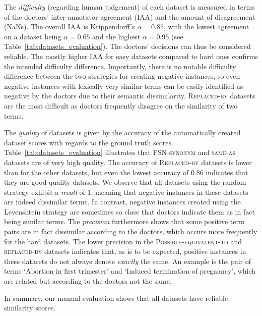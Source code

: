 \documentclass[letterpaper]{article} %
\newcommand{\lab}[1]{`#1'}
\newcommand{\dataset}[1]{\textsc{#1}}
\begin{document}
The \emph{difficulty} (regarding human judgement) of each dataset is measured in terms of the doctors' inter-annotator agreement (IAA) and the amount of disagreement (NaNs).
The overall IAA is Krippendorff's $\alpha = 0.85$,
with the lowest agreement on a dataset being $\alpha = 0.65$ and the highest $\alpha = 0.95$ (see Table~\ref{tab:datasets_evaluation}). The doctors' decisions can thus be considered reliable.
The mostly higher IAA for easy datasets compared to hard ones confirms the intended difficulty difference.
Importantly, there is no notable difficulty difference between the two strategies for creating negative instances, so even negative instances with lexically very similar terms can be easily identified as negative by the doctors due to their semantic dissimilarity.
\dataset{Replaced-by} datasets are the most difficult as doctors frequently disagree on the similarity of two terms. 

The \emph{quality} of datasets is given by the accuracy of the automatically created dataset scores with regards to the ground truth scores.
Table~\ref{tab:datasets_evaluation} illustrates that \dataset{FSN-synonym} and \dataset{same-as} datasets are of very high quality.
The accuracy of
\dataset{Replaced-by} datasets is lower than for the other datasets, but even the lowest accuracy of 0.86 indicates that they are good-quality datasets.
We observe that all datasets using the random strategy exhibit a \emph{recall} of 1, meaning that negative instances in these datasets are indeed dissimilar terms. 
In contrast, negative instances created using the Levenshtein strategy are sometimes so close that doctors indicate them as in fact being similar terms.
The \emph{precision} furthermore shows that some positive term pairs are in fact dissimilar according to the doctors, which
 occurs more frequently for the hard datasets.
The lower precision in the \dataset{Possibly-equivalent-to} and \dataset{replaced-by} datasets indicates that, as is to be expected, positive instances in these datasets do not always denote \emph{exactly} the same. An example is the pair of terms  \lab{Abortion in first trimester} and \lab{Induced termination of pregnancy}, which are related but according to the doctors not the same.

In summary, our manual evaluation shows that all datasets have reliable similarity scores. 


\end{document}
